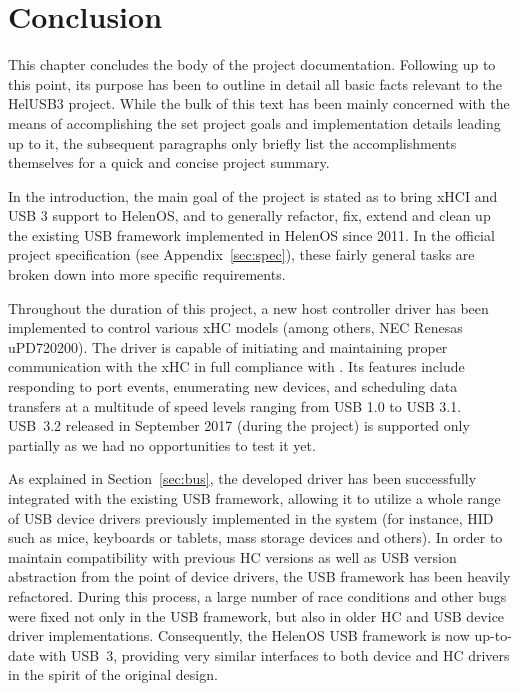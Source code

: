 \chapter{Conclusion}

This chapter concludes the body of the project documentation. Following up to
this point, its purpose has been to outline in detail all basic facts relevant
to the HelUSB3 project. While the bulk of this text has been mainly concerned
with the means of accomplishing the set project goals and implementation details
leading up to it, the subsequent paragraphs only briefly list the
accomplishments themselves for a quick and concise project summary.

In the introduction, the main goal of the project is stated as to bring xHCI and
USB 3 support to HelenOS, and to generally refactor, fix, extend and clean up the
existing USB framework implemented in HelenOS since 2011. In the official
project specification (see Appendix~\ref{sec:spec}), these fairly general tasks
are broken down into more specific requirements.

Throughout the duration of this project, a new host controller driver has been
implemented to control various xHC models (among others, NEC Renesas
uPD720200). The driver is capable of initiating and maintaining proper
communication with the xHC in full compliance with \cite{xhci}. Its features
include responding to port events, enumerating new devices, and scheduling data
transfers at a multitude of speed levels ranging from USB 1.0 to USB 3.1.
USB~3.2 released in September 2017 (during the project) is supported only
partially as we had no opportunities to test it yet.

As explained in Section~\ref{sec:bus}, the developed driver has been successfully
integrated with the existing USB framework, allowing it to utilize a whole range
of USB device drivers previously implemented in the system (for instance, HID
such as mice, keyboards or tablets, mass storage devices and others). In order
to maintain compatibility with previous HC versions as well as USB version
abstraction from the point of device drivers, the USB framework has been heavily
refactored. During this process, a large number of race conditions and other
bugs were fixed not only in the USB framework, but also in older HC and USB
device driver implementations. Consequently, the HelenOS USB framework is now
up-to-date with USB~3, providing very similar interfaces to both device and HC
drivers in the spirit of the original design.

